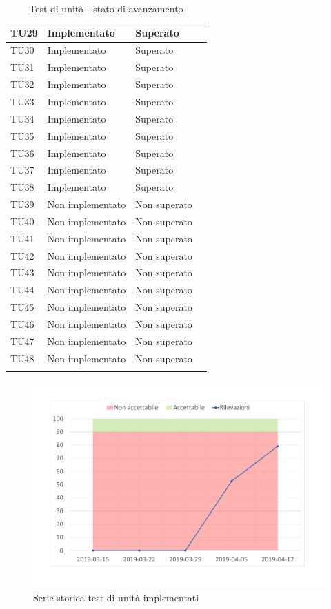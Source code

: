 \begin{longtable}{|>{\centering\arraybackslash}m{1.6cm}|>{\centering\arraybackslash}m{6.41cm}|>{\centering\arraybackslash}m{3.1cm}| c |}
	TU29 & Implementato & Superato  \\ \hline
	TU30 & Implementato & Superato  \\ \hline
	TU31 & Implementato & Superato  \\ \hline
	TU32 & Implementato & Superato  \\ \hline
	TU33 & Implementato & Superato  \\ \hline
	TU34 & Implementato & Superato  \\ \hline
	TU35 & Implementato & Superato \\ \hline
	TU36 & Implementato & Superato \\ \hline
	TU37 & Implementato & Superato  \\ \hline
	TU38 & Implementato & Superato  \\ \hline
	TU39 & Non implementato & Non superato \\ \hline
	TU40 & Non implementato & Non superato \\ \hline
	TU41 & Non implementato & Non superato \\ \hline
	TU42 & Non implementato & Non superato \\ \hline
	TU43 & Non implementato & Non superato \\ \hline
	TU44 & Non implementato & Non superato \\ \hline
	TU45 & Non implementato & Non superato \\ \hline
	TU46 & Non implementato & Non superato \\ \hline
	TU47 & Non implementato & Non superato \\ \hline
	TU48 & Non implementato & Non superato \\ \hline
	\caption{Test di unità - stato di avanzamento}
\end{longtable}

\begin{figure}[H]
	\centering
	\includegraphics[scale=0.6]{images/resoconto/MPC6Chart.pdf}
	\caption{Serie storica test di unità implementati}	
\end{figure}

